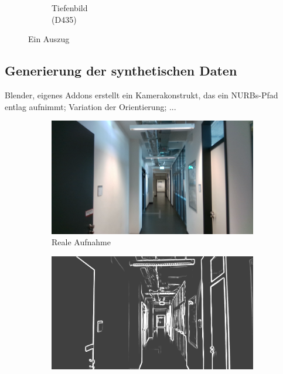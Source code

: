 \begin{figure}[H]
\begin{subfigure}[b]{0.3\linewidth}
		\caption{Tiefenbild \\ (D435) \hspace*{2cm}}
	\end{subfigure}
	\caption{Ein Auszug}
	\label{fig:dataset}
\end{figure}


\subsection{Generierung der synthetischen Daten}
Blender,
eigenes Addons erstellt ein Kamerakonstrukt, das ein NURBs-Pfad entlag aufnimmt; Variation der Orientierung; ...


\vspace{\fill}
\begin{figure}[htp]
	\centering
	\begin{subfigure}[b]{0.45\linewidth}
		\centering
		\includegraphics[width=\linewidth]{images/example/r000305.png}
		\caption{Reale Aufnahme}
		\label{subfig:real}
	\end{subfigure}
	\hfill
	\begin{subfigure}[b]{0.45\linewidth}
		\centering
		\includegraphics[width=\linewidth]{images/example/rg000305.png}

\end{subfigure}
\end{figure}
